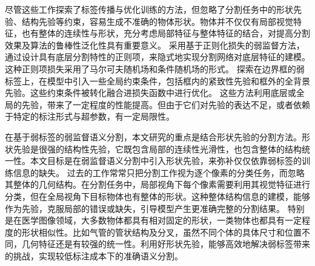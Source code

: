 尽管这些工作探索了标签传播与优化训练的方法，但忽略了分割任务中的形状先验、结构先验等约束，容易生成不准确的物体形状。物体并不仅仅有局部视觉特征，也有整体的连续性与形状，充分考虑局部特征与整体特征的结合，对提高分割效果及算法的鲁棒性泛化性具有重要意义。
\citet{tang2018regularized} 采用基于正则化损失的弱监督方法，通过设计具有底层分割特性的正则项，来隐式地实现分割网络对底层特征的建模。这种正则项损失采用了马尔可夫随机场和条件随机场的形式。
\citet{kervadec2020bounding} 探索在边界框的弱标签上，在模型中引入一些全局约束条件，包括框内的紧致性先验和框外的全背景先验。这些约束条件被转化融合进损失函数中进行优化。
这些方法利用底层或全局的先验，带来了一定程度的性能提高。但由于它们对先验的表达不足，或者依赖于特定的标注形式与超参数，有一定局限性。

在基于弱标签的弱监督语义分割，本文研究的重点是结合形状先验的分割方法。形状先验是很强的结构性先验，它既包含局部的连续性光滑性，也包含整体的结构统一性。本文目标是在弱监督语义分割中引入形状先验，来弥补仅仅依靠弱标签的训练信息的缺失。
过去的工作常常只把分割工作视为逐个像素的分类任务，而忽略其整体的几何结构。在分割任务中，局部视角下每个像素需要利用其视觉特征进行分类，但在全局视角下目标物体也有整体的形状。这种整体结构信息的建模，能够作为先验，克服局部的错误或缺失，引导模型产生更准确完整的分割结果。
特别是在医学图像领域，大多数物体都具有相对固定的形状，一类物体也都具有一定程度的形状相似性。比如气管的管状结构及分叉，虽然不同个体的具体尺寸和位置不同，几何特征还是有较强的统一性。利用好形状先验，能够高效地解决弱标签带来的挑战，实现较低标注成本下的准确语义分割。


